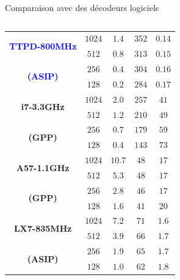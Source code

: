 \documentclass[t,compress,mathserif,12pt,xcolor=dvipsnames]{beamer}
\newcommand{\BLUE} [1]{\textcolor{blue}{\textbf{#1}}}
\begin{document}
\begin{frame}[c]{Comparaison avec des décodeurs logiciels}
\begin{columns}[T]
\begin{column}{.48\textwidth}
{\begin{table}
{{\begin{tabular}{c|c|c|c|c}
				\multirow{2}{*}{\bf \BLUE{TTPD-800MHz}}            & $1024$   & $1.4$  & $352$ & $0.14$ \\ %
				                                            & $512$    & $0.8$  & $313$ & $0.15$ \\ %
				\multirow{2}{*}{\bf \BLUE{(ASIP)}}                 & $256$    & $0.4$  & $304$ & $0.16$ \\ %
				                                            & $128$    & $0.2$  & $284$ & $0.17$ \\ %
				\midrule
				\multirow{2}{*}{\bf i7-3.3GHz}              & $1024$   & $2.0$  & $257$ & $41$   \\
				                                            & $512$    & $1.2$  & $210$ & $49$   \\
				\multirow{2}{*}{\bf (GPP)}                  & $256$    & $0.7$  & $179$ & $59$   \\
				                                            & $128$    & $0.4$  & $143$ & $73$   \\
				\midrule    
				\multirow{2}{*}{\bf A57-1.1GHz}             & $1024$   & $10.7$ & $48$  & $17$   \\
				                                            & $512$    & $5.3$  & $48$  & $17$   \\
				\multirow{2}{*}{\bf (GPP)}                  & $256$    & $2.8$  & $46$  & $17$   \\
				                                            & $128$    & $1.6$  & $41$  & $20$   \\
				\midrule
				\multirow{2}{*}{\bf LX7-835MHz}             & $1024$   & $7.2$  & $71$  & $1.6$  \\
				                                            & $512$    & $3.9$  & $66$  & $1.7$  \\
				\multirow{2}{*}{\bf (ASIP)}                 & $256$    & $1.9$  & $65$  & $1.7$  \\
				                                            & $128$    & $1.0$  & $62$  & $1.8$  \\
				\bottomrule
			\end{tabular}
			}}
		\end{table}
	}
		
\end{column}
\end{columns}
\end{frame}
\end{document}
